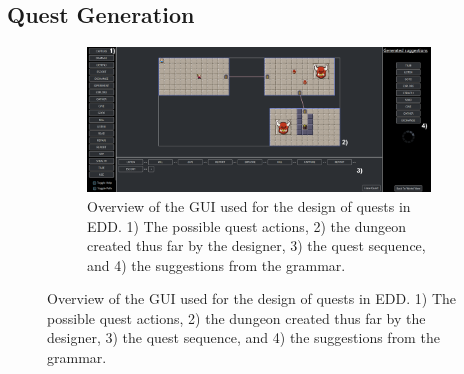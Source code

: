 \subsection{Quest Generation}

\begin{figure}[t]
    \centering
    \captionsetup[subfigure]{width=0.9\textwidth}
    \begin{subfigure}[t]{1\textwidth}
        \centering
        \includegraphics[width=.9\textwidth]{included-papers-tex/paper-8/figures/main.png}
        \caption{Overview of the GUI used for the design of quests in EDD. 1) The possible quest actions, 2) the dungeon created thus far by the designer, 3) the quest sequence, and 4) the suggestions from the grammar.}
        \label{figs:GUI:overview}
    \end{subfigure} \hfill%
     

\end{figure}
